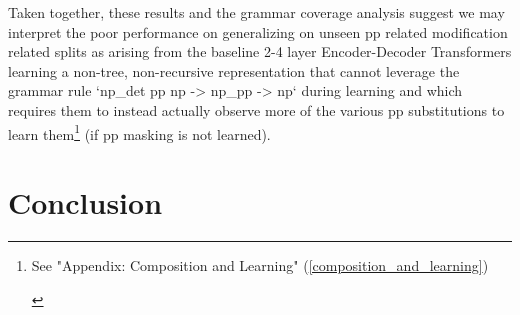 \documentclass[11pt]{article}
\begin{document}
Taken together, these results and the grammar coverage analysis suggest we may interpret the poor performance on generalizing on unseen pp related modification related splits as arising from the baseline 2-4 layer Encoder-Decoder Transformers learning a non-tree, non-recursive representation that cannot leverage the grammar rule `np\_det pp np -> np\_pp -> np` during learning and which requires them to instead actually observe more of the various pp substitutions to learn them\footnote{\begin{footnotesize}See "Appendix: Composition and Learning" (\ref{composition_and_learning})\end{footnotesize}} (if pp masking is not learned).
\section{Conclusion} 
\end{document}
